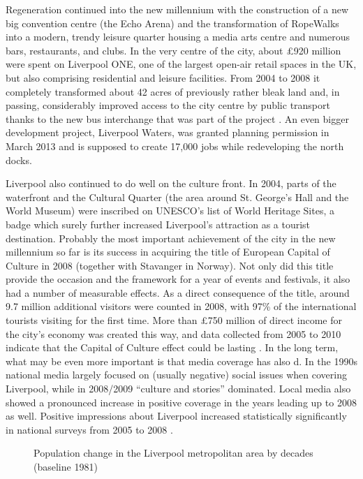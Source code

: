 Regeneration continued into the new millennium with the construction of a new big convention centre (the Echo Arena) and the transformation of RopeWalks into a modern, trendy leisure quarter housing a media arts centre and numerous bars, restaurants, and clubs.
In the very centre of the city, about £920 million were spent on Liverpool ONE, one of the largest open-air retail spaces in the UK, but also comprising residential and leisure facilities.
From 2004 to 2008 it completely transformed about 42 acres of previously rather bleak land and, in passing, considerably improved access to the city centre by public transport thanks to the new bus interchange that was part of the project \parencite[cf.][478--479]{murden2006}.
An even bigger development project, Liverpool Waters, was granted planning permission in March 2013 and is supposed to create 17,000 jobs while redeveloping the north docks.

Liverpool also continued to do well on the culture front.
In 2004, parts of the waterfront and the Cultural Quarter (the area around St. George's Hall and the World Museum) were inscribed on UNESCO's list of World Heritage Sites, a badge which surely further increased Liverpool's attraction as a tourist destination.
Probably the most important achievement of the city in the new millennium so far is its success in acquiring the title of European Capital of Culture in 2008 (together with Stavanger in Norway).
Not only did this title provide the occasion and the framework for a year of events and festivals, it also had a number of measurable effects.
As a direct consequence of the title, around 9.7 million additional visitors were counted in 2008, with 97\% of the international tourists visiting for the first time.
More than £750 million of direct income for the city's economy was created this way, and data collected from 2005 to 2010 indicate that the Capital of Culture effect could be lasting \parencite{garciaetal2010}.
In the long term, what may be even more important is that media coverage has also d.
In the 1990s national media largely focused on (usually negative) social issues when covering Liverpool, while in 2008/2009 ``culture and  stories'' dominated.
Local media also showed a pronounced increase in positive coverage in the years leading up to 2008 as well.
Positive impressions about Liverpool increased statistically significantly in national surveys from 2005 to 2008 \citep[cf.][25 and 44--46]{garciaetal2010}.

	\begin{figure}
		
		
		\caption[Population change in the Liverpool area]{Population change in the Liverpool metropolitan area by decades (baseline 1981)}
		\label{fig.population}
	\end{figure}

